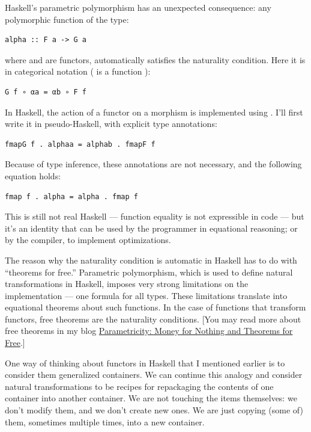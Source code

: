 Haskell's parametric polymorphism has an unexpected consequence: any
polymorphic function of the type:

\begin{verbatim}
alpha :: F a -> G a
\end{verbatim}

where  and  are functors, automatically satisfies
the naturality condition. Here it is in categorical notation (
is a function ):

\begin{verbatim}
G f ∘ αa = αb ∘ F f
\end{verbatim}

In Haskell, the action of a functor  on a morphism 
is implemented using . I'll first write it in
pseudo-Haskell, with explicit type annotations:

\begin{verbatim}
fmapG f . alphaa = alphab . fmapF f
\end{verbatim}

Because of type inference, these annotations are not necessary, and the
following equation holds:

\begin{verbatim}
fmap f . alpha = alpha . fmap f
\end{verbatim}

This is still not real Haskell --- function equality is not expressible
in code --- but it's an identity that can be used by the programmer in
equational reasoning; or by the compiler, to implement optimizations.

The reason why the naturality condition is automatic in Haskell has to
do with ``theorems for free.'' Parametric polymorphism, which is used to
define natural transformations in Haskell, imposes very strong
limitations on the implementation --- one formula for all types. These
limitations translate into equational theorems about such functions. In
the case of functions that transform functors, free theorems are the
naturality conditions. {[}You may read more about free theorems in my
blog
\href{https://bartoszmilewski.com/2014/09/22/parametricity-money-for-nothing-and-theorems-for-free/}{Parametricity:
Money for Nothing and Theorems for Free}.{]}

One way of thinking about functors in Haskell that I mentioned earlier
is to consider them generalized containers. We can continue this analogy
and consider natural transformations to be recipes for repackaging the
contents of one container into another container. We are not touching
the items themselves: we don't modify them, and we don't create new
ones. We are just copying (some of) them, sometimes multiple times, into
a new container.

